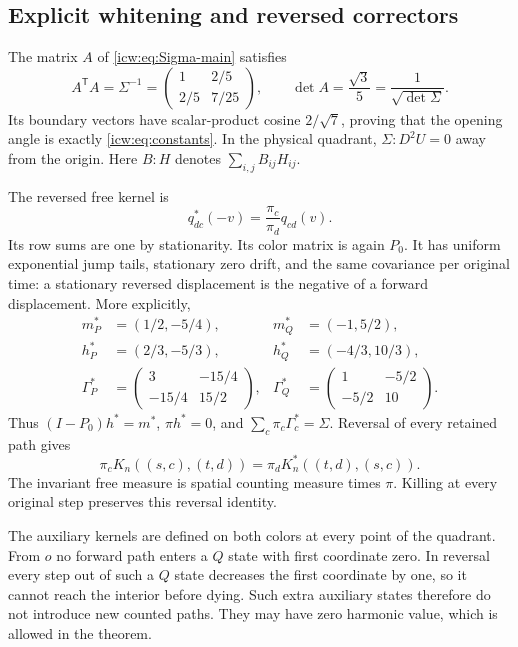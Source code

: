 \documentclass[11pt,letterpaper]{article}
\theoremstyle{remark}\newtheorem{remark}[theorem]{Remark}
\newcommand{\1}{\mathbf1}
\newcommand{\dett}{\sqrt{\det\Sigma}}
\begin{document}
\subsection{Explicit whitening and reversed correctors}\label{icw:sub:whitening}
The matrix $A$ of \eqref{icw:eq:Sigma-main} satisfies
\[
 A^{\mathsf T}A=\Sigma^{-1}
 =\begin{pmatrix}1&2/5\\2/5&7/25\end{pmatrix},\qquad
 \det A=\frac{\sqrt3}{5}=\frac1{\dett}.
\]
Its boundary vectors have scalar-product cosine $2/\sqrt7$, proving
that the opening angle is exactly \eqref{icw:eq:constants}. In the physical
quadrant, $\Sigma:D^2U=0$ away from the origin. Here $B:H$ denotes
$\sum_{i,j}B_{ij}H_{ij}$.

The reversed free kernel is
\begin{equation}\label{icw:eq:dual}
 q^*_{dc}(-v)=\frac{\pi_c}{\pi_d}q_{cd}(v).
\end{equation}
Its row sums are one by stationarity. Its color matrix is again $P_0$.
It has uniform exponential jump tails, stationary zero drift, and the
same covariance per original time: a stationary reversed displacement
is the negative of a forward displacement. More explicitly,
\begin{align*}
 m_P^*&=(1/2,-5/4),&m_Q^*&=(-1,5/2),\\
 h_P^*&=(2/3,-5/3),&h_Q^*&=(-4/3,10/3),\\
 \Gamma_P^*&=\begin{pmatrix}3&-15/4\\-15/4&15/2\end{pmatrix},&
 \Gamma_Q^*&=\begin{pmatrix}1&-5/2\\-5/2&10\end{pmatrix}.
\end{align*}
Thus $(I-P_0)h^*=m^*$, $\pi h^*=0$, and
$\sum_c\pi_c\Gamma_c^*=\Sigma$. Reversal of every retained path gives
\begin{equation}\label{icw:eq:reverse}
 \pi_cK_n((s,c),(t,d))=\pi_dK_n^*((t,d),(s,c)).
\end{equation}
The invariant free measure is spatial counting measure times $\pi$.
Killing at every original step preserves this reversal identity.

The auxiliary kernels are defined on both colors at every point of the
quadrant. From $o$ no forward path enters a $Q$ state with first coordinate
zero. In reversal every step out of such a $Q$ state decreases the first
coordinate by one, so it cannot reach the interior before dying. Such
extra auxiliary states therefore do not introduce new counted paths.
They may have zero harmonic value, which is allowed in the theorem.
\end{document}
